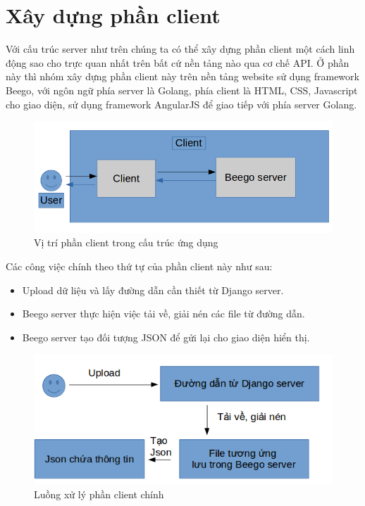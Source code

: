 \section{Xây dựng phần client}
Với cấu trúc server như trên chúng ta có thể xây dựng phần client một cách linh động sao cho trực quan nhất trên bất cứ nền tảng nào qua cơ chế API. Ở phần này thì nhóm xây dựng phần client này trên nền tảng website sử dụng framework Beego, với ngôn ngữ phía server là Golang, phía client là HTML, CSS, Javascript cho giao diện, sử dụng framework AngularJS để giao tiếp với phía server Golang.
\begin{figure}[h]
\centering
    \includegraphics[totalheight=5cm]{Images/app_postclient.png}
    \caption{Vị trí phần client trong cấu trúc ứng dụng}
    \label{skip_conn}
\end{figure}
Các công việc chính theo thứ tự của phần client này như sau:
\begin{itemize}
    \item Upload dữ liệu và lấy đường dẫn cần thiết từ Django server.
    \item Beego server thực hiện việc tải về, giải nén các file từ đường dẫn.
    \item Beego server tạo đối tượng JSON để gửi lại cho giao diện hiển thị.
\end{itemize}

\begin{figure}[h]
\centering
    \includegraphics[totalheight=7cm]{Images/app_beego_struct.png}
    \caption{Luồng xử lý phần client chính}
    \label{skip_conn}
\end{figure}

